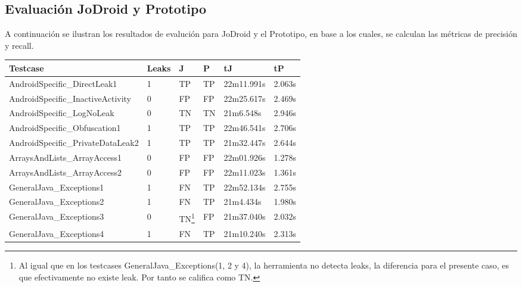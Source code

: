 \subsection{Evaluación JoDroid y Prototipo}
A continuación se ilustran los resultados de evalución para JoDroid y el
Prototipo, en base a los cuales, se calculan las métricas de precisión y recall. 
\label{subsec:jvsp}
\begin{table}[H]
\begin{center}
\small\addtolength{\tabcolsep}{-3pt}
\begin{tabular}{|p{6cm}|p{1cm}|p{1cm}|p{1cm}|p{}|p{1cm}|}
	\hline
	\textbf{Testcase} & \textbf{Leaks} & \textbf{J} &
	\textbf{P} & \textbf{ tJ} & 
	\textbf{tP}\\
	\hline
	AndroidSpecific\_DirectLeak1 & 1 & TP & TP & 22m11.991s &2.063s\\
	\hline
	AndroidSpecific\_InactiveActivity & 0 & FP & FP  & 22m25.617s &2.469s\\
	\hline
	AndroidSpecific\_LogNoLeak & 0 & TN & TN & 21m6.548s &2.946s\\
	\hline
	AndroidSpecific\_Obfuscation1 & 1 & TP & TP &22m46.541s&2.706s\\
	\hline
	 AndroidSpecific\_PrivateDataLeak2 & 1 & TP & TP &21m32.447s&2.644s\\
	\hline
	 ArraysAndLists\_ArrayAccess1 & 0 & FP & FP &22m01.926s& 1.278s\\
	\hline
	 ArraysAndLists\_ArrayAccess2 & 0 & FP & FP &22m11.023s&1.361s\\
	 \hline
	 GeneralJava\_Exceptions1 & 1 & FN & TP & 22m52.134s &2.755s\\
	\hline
	 GeneralJava\_Exceptions2 & 1 & FN & TP & 21m4.434s&1.980s\\
	\hline
	GeneralJava\_Exceptions3 & 0 & TN\footnote{Al igual que en
	los testcases GeneralJava\_Exceptions(1, 2 y 4), la herramienta no detecta
	leaks, la diferencia para el presente caso, es que efectivamente no existe
	leak. Por tanto se califica como TN.} & FP & 21m37.040s &2.032s\\
	\hline
	GeneralJava\_Exceptions4 & 1 & FN  & TP & 21m10.240s &2.313s\\

\end{tabular}
\end{center}
\end{table}
